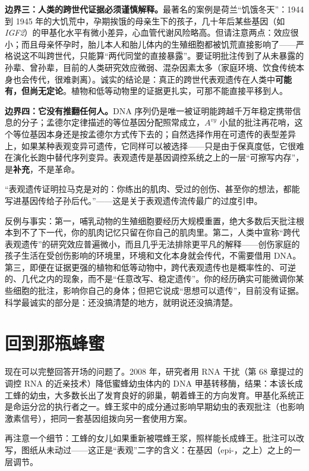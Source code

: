 \textbf{边界三：人类的跨世代证据必须谨慎解释。}最著名的案例是荷兰“饥饿冬天”：1944 到 1945 年的大饥荒中，孕期挨饿的母亲生下的孩子，几十年后某些基因（如 \emph{IGF2}）的甲基化水平有微小差异，心血管代谢风险略高。但请注意两点：效应很小；而且母亲怀孕时，胎儿本人和胎儿体内的生殖细胞都被饥荒直接影响了——严格说这不叫跨世代，只能算“两代同堂的直接暴露”。要证明批注传到了从未暴露的孙辈、曾孙辈，目前的人类研究效应微弱、混杂因素太多（家庭环境、饮食传统本身也会传代，很难剥离）。诚实的结论是：真正的跨世代表观遗传在人类中\textbf{可能有，但尚无定论}。植物和低等动物里的证据更扎实，可那不能直接平移到人。

\textbf{边界四：它没有推翻任何人。}DNA 序列仍是唯一被证明能跨越千万年稳定携带信息的分子；孟德尔定律描述的等位基因分配照常成立，$A^{vy}$ 小鼠的批注再花哨，这个等位基因本身还是按孟德尔方式传下去的；自然选择作用在可遗传的表型差异上，如果某种表观变异可遗传，它同样可以被选择——只是由于保真度低，它很难在演化长跑中替代序列变异。表观遗传是基因调控系统之上的一层“可擦写内存”，是\textbf{补充}，不是革命。

\begin{wuqu}
“表观遗传证明拉马克是对的：你练出的肌肉、受过的创伤、甚至你的想法，都能写进基因传给子孙后代。”——这是关于表观遗传流传最广的过度引申。

反例与事实：第一，哺乳动物的生殖细胞要经历大规模重置，绝大多数后天批注根本到不了下一代，你的肌肉记忆只留在你自己的肌肉里。第二，人类中宣称“跨代表观遗传”的研究效应普遍微小，而且几乎无法排除更平凡的解释——创伤家庭的孩子生活在受创伤影响的环境里，环境和文化本身就会传代，不需要借用 DNA。第三，即便在证据更强的植物和低等动物中，跨代表观遗传也是概率性的、可逆的、几代之内的现象，而不是“任意改写、稳定遗传”。你的经历确实可能微调你某些细胞的批注，影响你自己的身体；但把它说成“思想可以遗传”，目前没有证据。科学最诚实的部分是：还没搞清楚的地方，就明说还没搞清楚。
\end{wuqu}

\section{回到那瓶蜂蜜}

现在可以完整回答开场的问题了。2008 年，研究者用 RNA 干扰（第 68 章提过的调控 RNA 的近亲技术）降低蜜蜂幼虫体内的 DNA 甲基转移酶，结果：本该长成工蜂的幼虫，大多数长出了发育良好的卵巢，朝着蜂王的方向发育。甲基化系统正是命运分岔的执行者之一。蜂王浆中的成分通过影响早期幼虫的表观批注（也影响激素信号），把同一套基因组拨向另一套使用方案。

再注意一个细节：工蜂的女儿如果重新被喂蜂王浆，照样能长成蜂王。批注可以改写，图纸从未动过——这正是“表观”二字的含义：在基因（epi-，之上）之上的一层调节。

